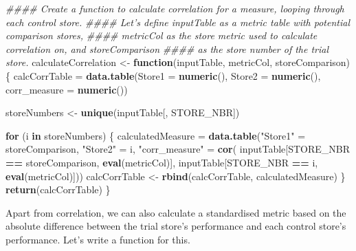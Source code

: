 \documentclass[
]{article}
\newenvironment{Shaded}{\begin{snugshade}}{\end{snugshade}}
\newcommand{\CommentTok}[1]{\textcolor[rgb]{0.56,0.35,0.01}{\textit{#1}}}
\newcommand{\ControlFlowTok}[1]{\textcolor[rgb]{0.13,0.29,0.53}{\textbf{#1}}}
\newcommand{\DataTypeTok}[1]{\textcolor[rgb]{0.13,0.29,0.53}{#1}}
\newcommand{\KeywordTok}[1]{\textcolor[rgb]{0.13,0.29,0.53}{\textbf{#1}}}
\newcommand{\NormalTok}[1]{#1}
\newcommand{\OperatorTok}[1]{\textcolor[rgb]{0.81,0.36,0.00}{\textbf{#1}}}
\newcommand{\StringTok}[1]{\textcolor[rgb]{0.31,0.60,0.02}{#1}}
\begin{document}
\begin{Shaded}
\begin{Highlighting}[]
\CommentTok{#### Create a function to calculate correlation for a measure, looping through each control store.}
\CommentTok{#### Let's define inputTable as a metric table with potential comparison stores, }
\CommentTok{#### metricCol as the store metric used to calculate correlation on, and storeComparison}
\CommentTok{#### as the store number of the trial store.}
\NormalTok{calculateCorrelation <-}\StringTok{ }\ControlFlowTok{function}\NormalTok{(inputTable, metricCol, storeComparison) \{}
\NormalTok{  calcCorrTable =}\StringTok{ }\KeywordTok{data.table}\NormalTok{(}\DataTypeTok{Store1 =} \KeywordTok{numeric}\NormalTok{(), }\DataTypeTok{Store2 =} \KeywordTok{numeric}\NormalTok{(), }\DataTypeTok{corr_measure =}
  \KeywordTok{numeric}\NormalTok{())}

\NormalTok{  storeNumbers <-}\StringTok{ }\KeywordTok{unique}\NormalTok{(inputTable[, STORE_NBR])}
  
  \ControlFlowTok{for}\NormalTok{ (i }\ControlFlowTok{in}\NormalTok{ storeNumbers) \{}
\NormalTok{    calculatedMeasure =}\StringTok{ }\KeywordTok{data.table}\NormalTok{(}\StringTok{"Store1"}\NormalTok{ =}\StringTok{ }\NormalTok{storeComparison,}
                                   \StringTok{"Store2"}\NormalTok{ =}\StringTok{ }\NormalTok{i,}
                                   \StringTok{"corr_measure"}\NormalTok{ =}\StringTok{ }\KeywordTok{cor}\NormalTok{( inputTable[STORE_NBR }\OperatorTok{==}\StringTok{ }\NormalTok{storeComparison,}
                                                                     \KeywordTok{eval}\NormalTok{(metricCol)], inputTable[STORE_NBR }\OperatorTok{==}\StringTok{ }\NormalTok{i,}
                                                                                                \KeywordTok{eval}\NormalTok{(metricCol)]))}
\NormalTok{    calcCorrTable <-}\StringTok{ }\KeywordTok{rbind}\NormalTok{(calcCorrTable, calculatedMeasure)}
\NormalTok{  \}}
  \KeywordTok{return}\NormalTok{(calcCorrTable)}
\NormalTok{\}}
\end{Highlighting}
\end{Shaded}

Apart from correlation, we can also calculate a standardised metric
based on the absolute difference between the trial store's performance
and each control store's performance. Let's write a function for this.
\end{document}
